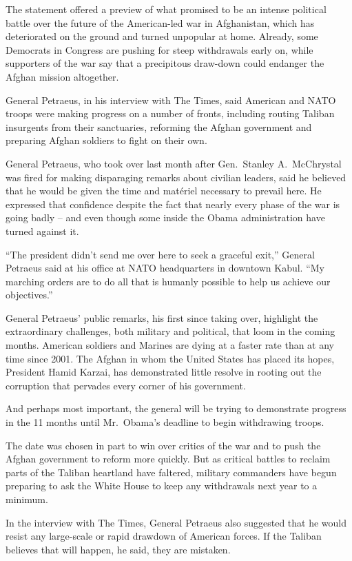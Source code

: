 ﻿\documentclass[12pt]{article}
\begin{document}
The statement offered a preview of what promised to be an intense political battle over the future
of the American-led war in Afghanistan, which has deteriorated on the ground and turned unpopular at
home. Already, some Democrats in Congress are pushing for steep withdrawals early on, while
supporters of the war say that a precipitous draw-down could endanger the Afghan mission altogether.

General Petraeus, in his interview with The Times, said American and NATO troops were making
progress on a number of fronts, including routing Taliban insurgents from their sanctuaries,
reforming the Afghan government and preparing Afghan soldiers to fight on their own.

General Petraeus, who took over last month after Gen.~Stanley A.~McChrystal was fired for making
disparaging remarks about civilian leaders, said he believed that he would be given the time and
mat\'eriel necessary to prevail here. He expressed that confidence despite the fact that nearly
every phase of the war is going badly -- and even though some inside the Obama administration have
turned against it.

``The president didn't send me over here to seek a graceful exit,'' General Petraeus said at his
office at NATO headquarters in downtown Kabul. ``My marching orders are to do all that is humanly
possible to help us achieve our objectives.''

General Petraeus' public remarks, his first since taking over, highlight the extraordinary
challenges, both military and political, that loom in the coming months. American soldiers and
Marines are dying at a faster rate than at any time since 2001. The Afghan in whom the United States
has placed its hopes, President Hamid Karzai, has demonstrated little resolve in rooting out the
corruption that pervades every corner of his government.

And perhaps most important, the general will be trying to demonstrate progress in the 11 months
until Mr.~Obama's deadline to begin withdrawing troops.

The date was chosen in part to win over critics of the war and to push the Afghan government to
reform more quickly. But as critical battles to reclaim parts of the Taliban heartland have
faltered, military commanders have begun preparing to ask the White House to keep any withdrawals
next year to a minimum.

In the interview with The Times, General Petraeus also suggested that he would resist any
large-scale or rapid drawdown of American forces. If the Taliban believes that will happen, he said,
they are mistaken.
\end{document}
